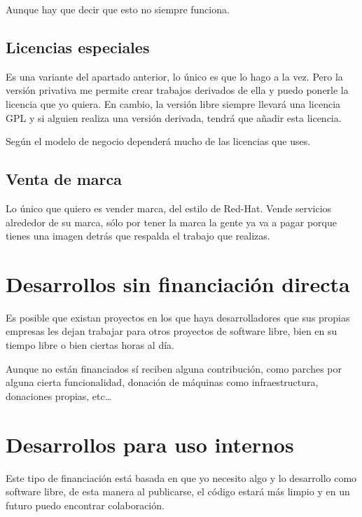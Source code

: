 Aunque hay que decir que esto no siempre funciona.

\subsection{Licencias especiales}
Es una variante del apartado anterior, lo único es que lo hago a la vez.
Pero la versión privativa me permite crear trabajos
derivados de ella y puedo ponerle la licencia que yo quiera. En cambio, la
versión libre siempre llevará una licencia GPL y si alguien realiza una versión
derivada, tendrá que añadir esta licencia.

Según el modelo de negocio dependerá mucho de las licencias que uses.

\subsection{Venta de marca}
Lo único que quiero es vender marca, del estilo de Red-Hat. Vende servicios
alrededor de su marca, sólo por tener la marca la gente ya va a pagar porque
tienes una imagen detrás que respalda el trabajo que realizas.

\section{Desarrollos sin financiación directa}
Es posible que existan proyectos en los que haya desarrolladores que sus
propias empresas les dejan trabajar para otros proyectos de software libre, bien
en su tiempo libre o bien ciertas horas al día.

Aunque no están financiados sí reciben alguna contribución, como parches por
alguna cierta funcionalidad, donación de máquinas como infraestructura,
donaciones propias, etc\ldots


\section{Desarrollos para uso internos}
Este tipo de financiación está basada en que yo necesito algo y lo desarrollo como
software libre, de esta manera al publicarse, el código estará más limpio y en un
futuro puedo encontrar colaboración.


